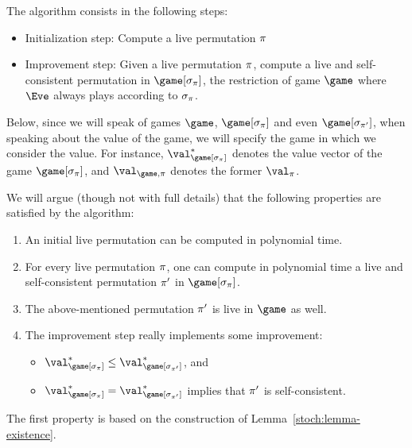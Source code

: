 The algorithm consists in the following steps:
\begin{itemize}
\item Initialization step: Compute a live permutation $\pi$
\item Improvement step: Given a live permutation $\pi$, compute a
  live and self-consistent permutation in $\game[\sigma_\perm]$, the
  restriction of game $\game$ where $\Eve$ always plays according to
  $\sigma_\pi$.
\end{itemize}
Below, since we will speak of games $\game$, $\game[\sigma_\perm]$ and
even $\game[\sigma_{\perm'}]$, when speaking about the value of the
game, we will specify the game in which we consider the value. For
instance, $\val^*_{\game[\sigma_\perm]}$ denotes the value vector of the game
$\game[\sigma_\perm]$, and $\val_{\game,\perm}$ denotes the former
$\val_\perm$.

We will argue (though not with full details) that the following
properties are satisfied by the algorithm:
\begin{enumerate}
\item An initial live permutation can be computed in polynomial time.
\item For every live permutation $\pi$, one can compute in
  polynomial time a live and self-consistent permutation $\pi'$ in
  $\game[\sigma_\perm]$.
\item The above-mentioned permutation $\pi'$ is live in $\game$ as
  well.
\item The improvement step really implements some improvement:
  \begin{itemize}
  \item $\val^*_{\game[\sigma_\perm]} \le
    \val^*_{\game[\sigma_{\perm'}]}$, and
  \item $\val^*_{\game[\sigma_\perm]} =
    \val^*_{\game[\sigma_{\perm'}]}$ implies that $\pi'$ is
    self-consistent.
  \end{itemize}
\end{enumerate}

The first property is based on the construction of
Lemma~\ref{stoch:lemma-existence}.

